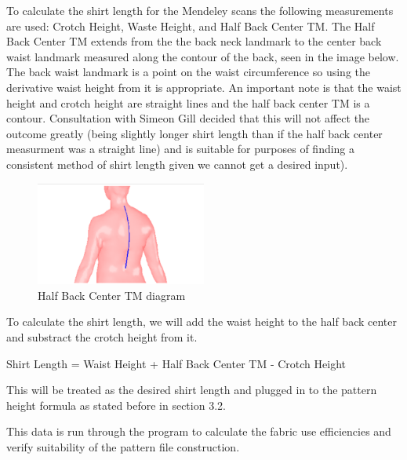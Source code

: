 To calculate the shirt length for the Mendeley scans the following measurements are used: Crotch Height, Waste Height, and Half Back Center TM. The Half Back Center TM extends from the the back neck landmark to the center back waist landmark measured along the contour of the back, seen in the image below. The back waist landmark is a point on the waist circumference so using the derivative waist height from it is appropriate. An important note is that the waist height and crotch height are straight lines and the half back center TM is a contour. Consultation with Simeon Gill decided that this will not affect the outcome greatly (being slightly longer shirt length than if the half back center measurment was a straight line) and is suitable for purposes of finding a consistent method of shirt length given we cannot get a desired input).
\begin{figure} [H] %
    \centering %
    \includegraphics[width = 0.5\textwidth]{Images/HBC TM.png} %
    \caption{Half Back Center TM diagram}
    \label{} %
\end{figure}
To calculate the shirt length, we will add the waist height to the half back center and substract the crotch height from it.

Shirt Length = Waist Height + Half Back Center TM - Crotch Height

This will be treated as the desired shirt length and plugged in to the pattern height formula as stated before in section 3.2. 

This data is run through the program to calculate the fabric use efficiencies and verify suitability of the pattern file construction.
